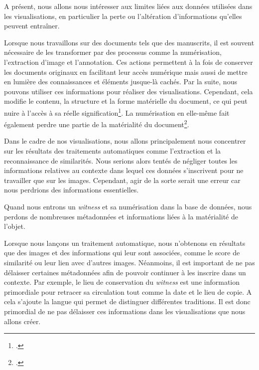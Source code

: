 A présent, nous allons nous intéresser aux limites liées aux données utilisées dans les visualisations, en particulier la perte ou l'altération d'informations qu'elles peuvent entraîner.

Lorsque nous travaillons sur des documents tels que des manuscrits, il est souvent nécessaire de les transformer par des processus comme la numérisation, l'extraction d'image et l'annotation. Ces actions permettent à la fois de conserver les documents originaux en facilitant leur accès numérique mais aussi de mettre en lumière des connaissances et éléments jusque-là cachés. Par la suite, nous pouvons utiliser ces informations pour réaliser des visualisations. Cependant, cela modifie le contenu, la structure et la forme matérielle du document, ce qui peut nuire à l'accès à sa réelle signification\footcite{vancisinExternalizingTransformationsHistorical2020}. La numérisation en elle-même fait également perdre une partie de la matérialité du document\footcite{maBoundariesExtensionsChallenges2022}.

Dans le cadre de nos visualisations, nous allons principalement nous concentrer sur les résultats des traitements automatiques comme l'extraction et la reconnaissance de similarités. Nous serions alors tentés de négliger toutes les informations relatives au contexte dans lequel ces données s'inscrivent pour ne travailler que sur les images. Cependant, agir de la sorte serait une erreur car nous perdrions des informations essentielles. 

Quand nous entrons un \textit{witness} et sa numérisation dans la base de données, nous perdons de nombreuses métadonnées et informations liées à la matérialité de l'objet.

Lorsque nous lançons un traitement automatique, nous n'obtenons en résultats que des images et des informations qui leur sont associées, comme le score de similarité ou leur lien avec d'autres images. Néanmoins, il est important de ne pas délaisser certaines métadonnées afin de pouvoir continuer à les inscrire dans un contexte. Par exemple, le lieu de conservation du \textit{witness} est une information primordiale pour retracer sa circulation tout comme la date et le lieu de copie. A cela s'ajoute la langue qui permet de distinguer différentes traditions. Il est donc primordial de ne pas délaisser ces informations dans les visualisations que nous allons créer. \\